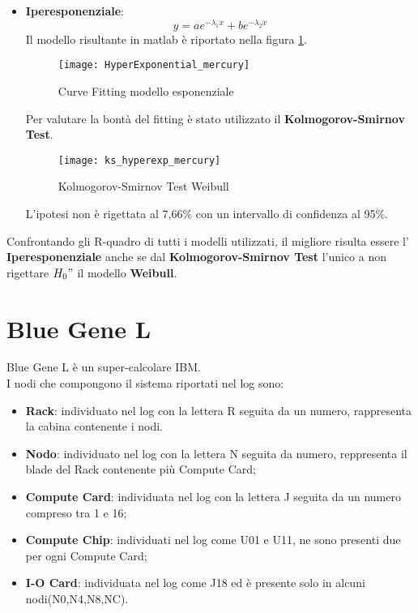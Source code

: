 \begin{itemize}
  \clearpage

  \item \textbf{Iperesponenziale}:
  $$ y = a e^{- \lambda_1  x} +  b  e^{- \lambda_2  x} $$
  Il modello risultante in matlab è riportato nella figura \ref{HyperExponential_mercury}.\\

  \begin{figure}[!htbp]
    \texttt{[image: HyperExponential\_mercury]}
    \caption{Curve Fitting modello esponenziale}
    \label{HyperExponential_mercury}
  \end{figure}

  Per valutare la bontà del fitting è stato utilizzato il \textbf{Kolmogorov-Smirnov Test}.\\

  \begin{figure}[!htbp]
    \centering
    \texttt{[image: ks\_hyperexp\_mercury]}
    \caption{Kolmogorov-Smirnov Test Weibull}
    \label{ks_hyperexp_mercury}
  \end{figure}

  L'ipotesi non è rigettata al 7,66\% con un intervallo di confidenza al 95\%.\\

  \clearpage
\end{itemize}

Confrontando gli R-quadro di tutti i modelli utilizzati, il migliore risulta essere l'
\textbf{Iperesponenziale} anche se dal \textbf{Kolmogorov-Smirnov Test} l'unico
a non rigettare $H_0"$ il modello \textbf{Weibull}.\\

\clearpage

\section{Blue Gene L}
Blue Gene L è un super-calcolare IBM.\\
I nodi che compongono il sistema riportati nel log sono:
\begin{itemize}
  \item \textbf{Rack}: individuato nel log con la lettera R seguita da un numero,
  rappresenta la cabina contenente i nodi.\\
  \item \textbf{Nodo}: individuato nel log con la lettera N seguita da numero,
  reppresenta il blade del Rack contenente più Compute Card;
  \item \textbf{Compute Card}: individuata nel log con la lettera J seguita da un
  numero compreso tra 1 e 16;
  \item \textbf{Compute Chip}: individuati nel log come U01 e U11, ne sono presenti
  due per ogni Compute Card;
  \item \textbf{I-O Card}: individuata nel log come J18 ed è presente solo in alcuni
  nodi(N0,N4,N8,NC).
\end{itemize}


